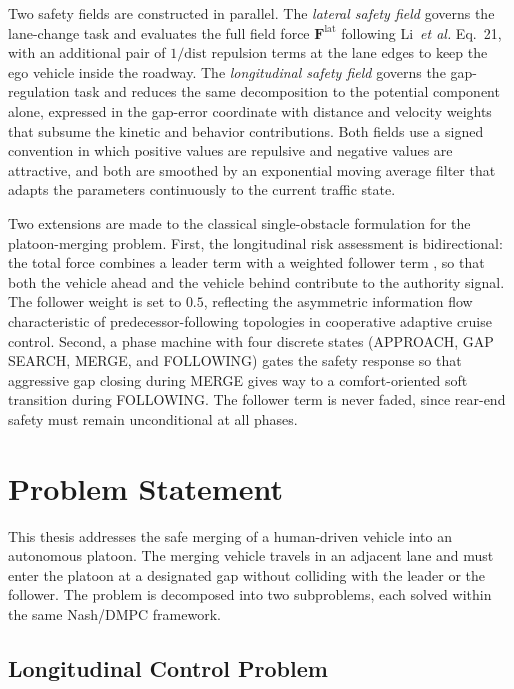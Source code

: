 \documentclass[12pt,a4paper,oneside]{report}
\begin{document}
Two safety fields are constructed in parallel. The \emph{lateral safety field} governs the
lane-change task and evaluates the full field force $\mathbf{F}^{\text{lat}}$ following
Li~\emph{et al.} Eq.~21, with an additional pair of $1/\mathrm{dist}$ repulsion terms at
the lane edges to keep the ego vehicle inside the roadway. The \emph{longitudinal safety
field} governs the gap-regulation task and reduces the same decomposition to the potential
component alone, expressed in the gap-error coordinate with distance and velocity weights
that subsume the kinetic and behavior contributions. Both fields use a signed convention
in which positive values are repulsive and negative values are attractive, and both are
smoothed by an exponential moving average filter that adapts the parameters continuously
to the current traffic state.

Two extensions are made to the classical single-obstacle formulation for the platoon-merging
problem. First, the longitudinal risk assessment is bidirectional: the total force combines
a leader term with a weighted follower term \cite{wangDrivingSafetyField2015}, so that both the
vehicle ahead and the vehicle behind contribute to the authority signal. The follower weight
is set to $0.5$, reflecting the asymmetric information flow characteristic of
predecessor-following topologies in cooperative adaptive cruise control. Second, a phase
machine with four discrete states (APPROACH, GAP SEARCH, MERGE, and FOLLOWING) gates
the safety response so that aggressive gap closing during MERGE gives way to a comfort-oriented
soft transition during FOLLOWING. The follower term is never faded, since rear-end safety
must remain unconditional at all phases.

\section{Problem Statement}

This thesis addresses the safe merging of a human-driven vehicle into an autonomous
platoon. The merging vehicle travels in an adjacent lane and must enter the platoon at
a designated gap without colliding with the leader or the follower. The problem is
decomposed into two subproblems, each solved within the same Nash/DMPC framework.


\subsection{Longitudinal Control Problem}
\end{document}
